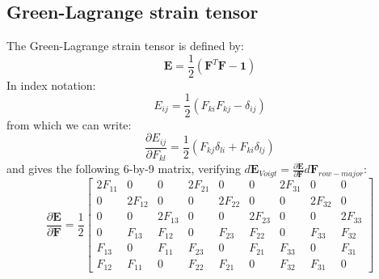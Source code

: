 \documentclass[letterpaper,12pt,oneside]{report}
\begin{document}
\subsection{Green-Lagrange strain tensor}
The Green-Lagrange strain tensor is defined by:
\begin{equation}
\mathbf{E} = \frac{1}{2}\left(\mathbf{F}^T \mathbf{F} - \mathbf{1}\right)
\end{equation}
In index notation:
\begin{equation}
E_{ij} = \frac{1}{2}\left(F_{ki} F_{kj} - \delta_{ij}\right)
\end{equation}
from which we can write:
\begin{equation}
\frac{\partial E_{ij}}{\partial F_{kl}} = \frac{1}{2}\left(F_{kj} \delta_{li} + F_{ki} \delta_{lj}\right)
\end{equation}
and gives the following 6-by-9 matrix, verifying $d\mathbf{E}_{Voigt} = \frac{\partial \mathbf{E}}{\partial \mathbf{F}} d\mathbf{F}_{row-major}$:
\begin{equation}
\frac{\partial \mathbf{E}}{\partial \mathbf{F}} = \frac{1}{2}
\left[\begin{array}{ccccccccc}
2F_{11} & 0 & 0 & 2F_{21} & 0 & 0 & 2F_{31} & 0 & 0 \\
0 & 2F_{12} & 0 & 0 & 2F_{22} & 0 & 0 & 2F_{32} & 0 \\
0 & 0 & 2F_{13} & 0 & 0 & 2F_{23} & 0 & 0 & 2F_{33} \\
0 & F_{13} & F_{12} & 0 & F_{23} & F_{22} & 0 & F_{33} & F_{32} \\
F_{13} & 0 & F_{11} & F_{23} & 0 & F_{21} & F_{33} & 0 & F_{31} \\
F_{12} & F_{11} & 0 & F_{22} & F_{21} & 0 & F_{32} & F_{31} & 0
\end{array}\right]
\end{equation}
\end{document}
